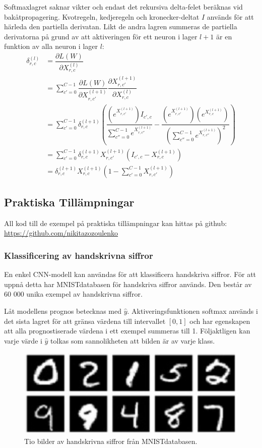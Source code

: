 \documentclass[a4paper,11pt,twoside]{article}
\newcommand*{\pd}[2]{\ensuremath{\dfrac{\partial #1}{\partial #2}}}
\begin{document}
Softmaxlagret saknar vikter och endast det rekursiva delta-felet beräknas vid bakåtpropagering. Kvotregeln, kedjeregeln och kronecker-deltat $I$ används för att härleda den partiella derivatan. Likt de andra lagren summeras de partiella derivatorna på grund av att aktiveringen för ett neuron i lager $l+1$ är en funktion av alla neuron i lager $l$: \cite{cs231n} \cite{notesonbackprop} \cite{websoftmax} 
\begin{equation}
\begin{split}
\delta^{(l)}_{r,c}
		& = \pd{L(W)}{X^{(l)}_{r,c}} \\
		& = \sum^{C-1}_{c'=0} \pd{L(W)}{X^{(l+1)}_{r,c'}} \pd{X^{(l+1)}_{r,c'}}{X^{(l)}_{r,c}} \\
		& = \sum^{C-1}_{c'=0} \delta^{(l+1)}_{r,c} \left(  \dfrac{(e^{X^{(l+1)}_{r,c'}})I_{c',c}}{\sum^{C-1}_{c''=0}e^{X^{(l+1)}_{r,c''}}} - \dfrac{(e^{X^{(l+1)}_{r,c'}})(e^{X^{(l+1)}_{r,c}})}{(\sum^{C-1}_{c''=0}e^{X^{(l+1)}_{r,c''}})^2} \right) \\
		& = \sum^{C-1}_{c'=0}  \delta^{(l+1)}_{r,c} X^{(l+1)}_{r,c'}(I_{c',c}-X^{(l+1)}_{r,c}) \\
		& = \delta^{(l+1)}_{r,c} X^{(l+1)}_{r,c} \left( 1-\sum^{C-1}_{c'=0} X^{(l+1)}_{r,c'} \right)
\end{split}
\end{equation}

\subsection{Praktiska Tillämpningar}
All kod till de exempel på praktiska tillämpningar kan hittas på github: \url{https://github.com/nikitazozoulenko}
\subsubsection{Klassificering av handskrivna siffror}
En enkel CNN-modell kan användas för att klassificera handskriva siffror. För att uppnå detta har MNISTdatabasen för handskriva siffror används. Den består av 60 000 unika exempel av handskrivna siffror. \cite{MNIST}

Låt modellens prognos betecknas med $\hat{y}$. Aktiveringsfunktionen softmax används i det sista lagret för att gränsa värdena till intervallet $[0,1]$ och har egenskapen att alla prognostiserade värdena i ett exempel summeras till 1. Följaktligen kan varje värde i $\hat{y}$ tolkas som sannolikheten att bilden är av varje klass. \cite{cs231n}

\begin{figure}[h]\label{figMNIST}
	\centering
  		\includegraphics[scale=1]{mnist.png}
  	\caption{Tio bilder av handskrivna siffror från MNISTdatabasen. \cite{MNIST}}
\end{figure}
\end{document}
